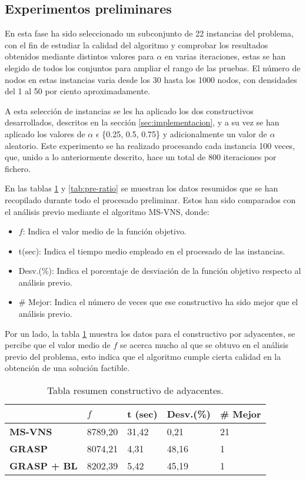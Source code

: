 \subsection{Experimentos preliminares}
En esta fase ha sido seleccionado un subconjunto de 22 instancias del problema, con el fin de estudiar la calidad del algoritmo y comprobar los resultados obtenidos mediante distintos valores para $\alpha$ en varias iteraciones, estas se han elegido de todos los conjuntos para ampliar el rango de las pruebas. El número de nodos en estas instancias varia desde los 30 hasta los 1000 nodos, con densidades del 1 al 50 por ciento aproximadamente.

A esta selección de instancias se les ha aplicado los dos constructivos desarrollados, descritos en la sección \ref{sec:implementacion}, y a su vez se han aplicado los valores de $\alpha$ $\epsilon$ \{0.25, 0.5, 0.75\} y adicionalmente un valor de $\alpha$ aleatorio.
Este experimento se ha realizado procesando cada instancia 100 veces, que, unido a lo anteriormente descrito, hace un total de 800 iteraciones por fichero.

En las tablas \ref{tab:pre-ady} y \ref{tab:pre-ratio} se muestran los datos resumidos que se han recopilado durante todo el procesado preliminar. Estos han sido comparados con el análisis previo mediante el algoritmo MS-VNS, donde:

\begin{itemize}
	\item $f$: Indica el valor medio de la función objetivo.
	\item t(sec): Indica el tiempo medio empleado en el procesado de las instancias.
	\item Desv.(\%): Indica el porcentaje de desviación de la función objetivo respecto al análisis previo.
	\item \# Mejor: Indica el número de veces que ese constructivo ha sido mejor que el análisis previo.
\end{itemize}

Por un lado, la tabla \ref{tab:pre-ady} muestra los datos para el constructivo por adyacentes, se percibe que el valor medio de $f$ se acerca mucho al que se obtuvo en el análisis previo del problema, esto indica que el algoritmo cumple cierta calidad en la obtención de una solución factible.

\begin{table}[H]
	\centering
	\begin{tabular}{lllll}
		\hline
		& \textbf{$f$} & \textbf{t (sec)} & \textbf{Desv.(\%)} & \textbf{\# Mejor} \\ \hline
		\textbf{MS-VNS}     & 8789,20    & 31,42            & 0,21             & 21                \\
		\textbf{GRASP}      & 8074,21    & 4,31             & 48,16            & 1                 \\
		\textbf{GRASP + BL} & 8202,39    & 5,42             & 45,19            & 1                 \\ \hline
	\end{tabular}
	\caption{Tabla resumen constructivo de adyacentes.}
	\label{tab:pre-ady}
\end{table}

